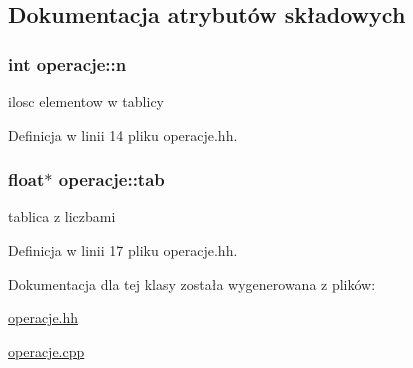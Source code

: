 \subsection{\-Dokumentacja atrybutów składowych}
\hypertarget{classoperacje_aec7cc301d8822128d918aa1f9c7e1db2}{
\subsubsection[{n}]{\setlength{\rightskip}{0pt plus 5cm}int {\bf operacje\-::n}}}\label{classoperacje_aec7cc301d8822128d918aa1f9c7e1db2}


ilosc elementow w tablicy 



\-Definicja w linii 14 pliku operacje.\-hh.

\hypertarget{classoperacje_ad23bc418eebc9b493a5494ffd9358dd0}{
\subsubsection[{tab}]{\setlength{\rightskip}{0pt plus 5cm}float$\ast$ {\bf operacje\-::tab}}}\label{classoperacje_ad23bc418eebc9b493a5494ffd9358dd0}


tablica z liczbami 



\-Definicja w linii 17 pliku operacje.\-hh.



\-Dokumentacja dla tej klasy została wygenerowana z plików\-:\begin{DoxyCompactItemize}
\item 
\hyperlink{operacje_8hh}{operacje.\-hh}\item 
\hyperlink{operacje_8cpp}{operacje.\-cpp}\end{DoxyCompactItemize}

